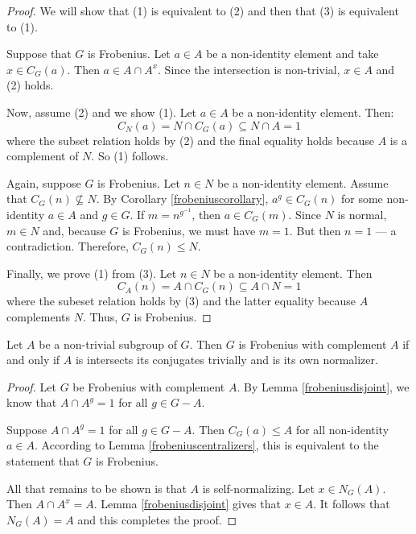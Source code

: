 \documentclass[main.tex]{subfiles}
\begin{document}
\begin{proof}
We will show that (1) is equivalent to (2) and then that (3) is equivalent to (1).

Suppose that $G$ is Frobenius. Let $a \in A$ be a non-identity element and take $x \in C_G(a)$. Then $a \in A \cap A^x$. Since the intersection is non-trivial, $x \in A$ and (2) holds.

Now, assume (2) and we show (1). Let $a \in A$ be a non-identity element. Then:
$$C_N(a) = N \cap C_G(a) \subseteq N \cap A = 1$$
where the subset relation holds by (2) and the final equality holds because $A$ is a complement of $N$. So (1) follows.

Again, suppose $G$ is Frobenius. Let $n \in N$ be a non-identity element. Assume that $C_G(n) \not\subseteq N$. By Corollary \ref{frobeniuscorollary}, $a^g \in C_G(n)$ for some non-identity $a \in A$ and $g \in G$. If $m = n^{g^{-1}}$, then $a \in C_G(m)$. Since $N$ is normal, $m \in N$ and, because $G$ is Frobenius, we must have $m=1$. But then $n = 1$ --- a contradiction. Therefore, $C_G(n) \le N$.

Finally, we prove (1) from (3). Let $n \in N$ be a non-identity element. Then
$$C_A(n) = A \cap C_G(n) \subseteq A \cap N = 1$$
where the subeset relation holds by (3) and the latter equality because $A$ complements $N$. Thus, $G$ is Frobenius.
\end{proof}

\begin{lemma}\label{frobeniusnormalizer}
Let $A$ be a non-trivial subgroup of $G$. Then $G$ is Frobenius with complement $A$ if and only if $A$ is intersects its conjugates trivially and is its own normalizer.
\end{lemma}

\begin{proof}
Let $G$ be Frobenius with complement $A$. By Lemma \ref{frobeniusdisjoint}, we know that $A \cap A^g = 1$ for all $g \in G - A$.

Suppose $A \cap A^g = 1$ for all $g \in G - A$. Then $C_G(a) \le A$ for all non-identity $a \in A$.  According to Lemma \ref{frobeniuscentralizers}, this is equivalent to the statement that $G$ is Frobenius.

All that remains to be shown is that $A$ is self-normalizing. Let $x \in N_G(A)$. Then $A \cap A^x = A$. Lemma \ref{frobeniusdisjoint} gives that $x \in A$. It follows that $N_G(A) = A$ and this completes the proof.
\end{proof}
\end{document}
